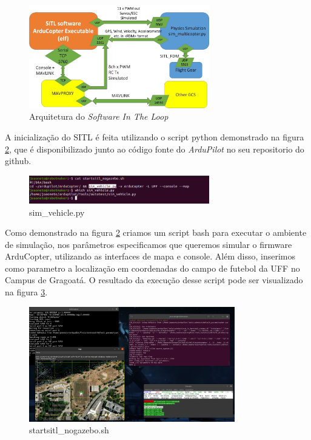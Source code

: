 \documentclass[12pt,a4paper,oneside]{book}
\begin{document}
%
\begin{figure}[H]
  \centering
  \includegraphics[width=0.7\textwidth]{Images/Diagramas/sitl_arq.jpg}
  \caption{Arquitetura do \textit{Software In The Loop}}
  \label{fig:sitl_arq.jpg.0}
\end{figure}
%



A inicialização do SITL é feita utilizando o script python demonstrado na figura \ref{fig:sim_vehicle.png.0}, que é disponibilizado junto ao código fonte do \textit{ArduPilot} no seu repositorio do github.

%
\begin{figure}[H]
  \centering
  \includegraphics[width=0.7\textwidth]{Images/Desenvolvimento/sim_vehicle.png}
  \caption{sim\_vehicle.py}
  \label{fig:sim_vehicle.png.0}
\end{figure}
%

Como demonstrado na figura \ref{fig:sim_vehicle.png.0} criamos um script bash para executar o ambiente de simulação, nos parâmetros especificamos que queremos simular o firmware ArduCopter, utilizando as interfaces de mapa e console. Além disso, inserimos como parametro a localização em coordenadas do campo de futebol da UFF no Campus de Gragoatá. O resultado da execução desse script pode ser visualizado na figura \ref{fig:startsitl_nogazebo.png.0}.

%
\begin{figure}[H]
  \centering
  \includegraphics[width=0.8\textwidth]{Images/Desenvolvimento/startsitl_nogazebo.png}
  \caption{startsitl\_nogazebo.sh}
  \label{fig:startsitl_nogazebo.png.0}
\end{figure}
%
\end{document}
